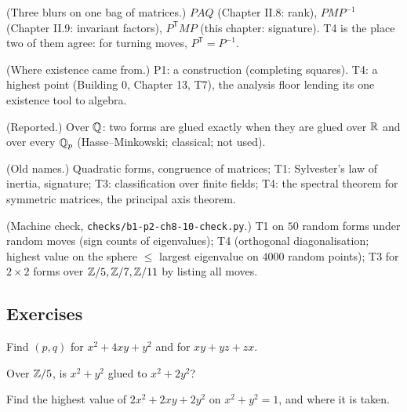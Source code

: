 \begin{lines}
\item[\lab{R1}] (Three blurs on one bag of matrices.) $PAQ$ (Chapter II.8: rank), $PMP^{-1}$ (Chapter II.9: invariant factors), $P^{\mathsf T}MP$ (this chapter: signature). T4 is the place two of them agree: for turning moves, $P^{\mathsf T} = P^{-1}$.
\item[\lab{R2}] (Where existence came from.) P1: a construction (completing squares). T4: a highest point (Building 0, Chapter 13, T7), the analysis floor lending its one existence tool to algebra.
\item[\lab{R3}] (Reported.) Over $\mathbb{Q}$: two forms are glued exactly when they are glued over $\mathbb{R}$ and over every $\mathbb{Q}_p$ (Hasse--Minkowski; classical; not used).
\item[\lab{R4}] (Old names.) Quadratic forms, congruence of matrices; T1: Sylvester's law of inertia, signature; T3: classification over finite fields; T4: the spectral theorem for symmetric matrices, the principal axis theorem.
\item[\lab{R5}] (Machine check, \texttt{checks/b1-p2-ch8-10-check.py}.) T1 on $50$ random forms under random moves (sign counts of eigenvalues); T4 (orthogonal diagonalisation; highest value on the sphere $\le$ largest eigenvalue on $4000$ random points); T3 for $2 \times 2$ forms over $\mathbb{Z}/5, \mathbb{Z}/7, \mathbb{Z}/11$ by listing all moves.
\end{lines}

\subsection*{Exercises}

\begin{lines}
\item[\lab{E1}] Find $(p, q)$ for $x^2 + 4xy + y^2$ and for $xy + yz + zx$.
\item[\lab{E2}] Over $\mathbb{Z}/5$, is $x^2 + y^2$ glued to $x^2 + 2y^2$?
\item[\lab{E3}] Find the highest value of $2x^2 + 2xy + 2y^2$ on $x^2 + y^2 = 1$, and where it is taken.
\end{lines}

\newpage

